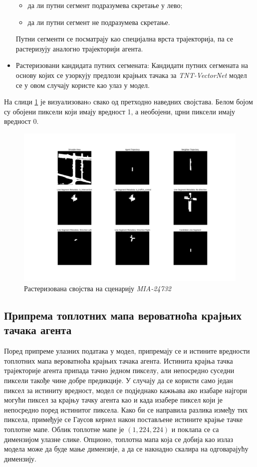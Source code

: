 \documentclass[11pt,oneside]{memoir}
\begin{document}
\begin{itemize}
\begin{itemize}
          \item да ли путни сегмент подразумева скретање у лево;
          \item да ли путни сегмент не подразумева скретање.
        \end{itemize}
        Путни сегменти се посматрају као специјална врста трајекторија, па се растеризују аналогно трајекторији агента.
  \item Растеризовани кандидата путних сегмената: Кандидати путних сегмената на основу којих се узоркују предлози крајњих тачака
        за \textit{TNT-VectorNet} модел се у овом случају користе као улаз у модел. 
\end{itemize}

На слици \ref{raster-MIA-24732} је визуализованo свако од претходно наведних својстава. Белом бојом су обојени пиксели који имају вредност 1,
а необојени, црни пиксели имају вредност 0. 

\begin{figure}[H]
  \centering
  \includegraphics[width=1.0\textwidth]{images/raster_MIA_24732.png}
  \caption{Растеризована својства на сценарију \textit{MIA-24732} \label{raster-MIA-24732}}
\end{figure}

\subsection{Припрема топлотних мапа вероватноћа крајњих тачака агента}

Поред припреме улазних података у модел, припремају се и истините вредности топлотних мапа вероватноћа крајњих тачака агента. 
Истинита крајња тачка трајекторије агента припада тачно једном пикселу, али непосредно суседни пиксели такође чине добре предикције. 
У случају да се користи само један пиксел за истиниту вредност, модел се подједнако кажњава ако изабаре најгори могући пиксел 
за крајњу тачку агента као и када изабере пиксел који је непосредно поред истинитог пиксела. 
Како би се направила разлика између тих пиксела, примеђује се Гаусов кернел након постављене истините крајње тачке топлотне мапе. 
Облик топлотне мапе је $(1, 224, 224)$ и поклапа се са димензијом улазне слике. 
Опционо, топлотна мапа која се добија као излаз модела може да буде мање димензије, а да се накнадно скалира на одговарајућу димензију. 
\end{document}
